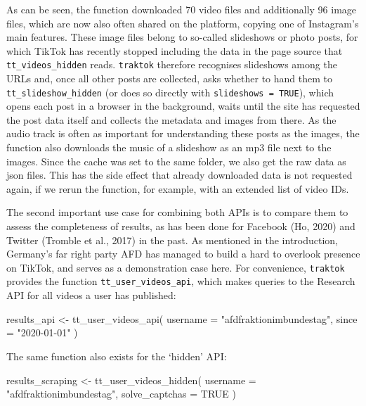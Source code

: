 \documentclass[
  nobib]{ccr}
\newenvironment{Shaded}{\begin{snugshade}}{\end{snugshade}}
\newcommand{\AttributeTok}[1]{\textcolor[rgb]{0.40,0.45,0.13}{#1}}
\newcommand{\ConstantTok}[1]{\textcolor[rgb]{0.56,0.35,0.01}{#1}}
\newcommand{\FunctionTok}[1]{\textcolor[rgb]{0.28,0.35,0.67}{#1}}
\newcommand{\NormalTok}[1]{\textcolor[rgb]{0.00,0.23,0.31}{#1}}
\newcommand{\OtherTok}[1]{\textcolor[rgb]{0.00,0.23,0.31}{#1}}
\newcommand{\StringTok}[1]{\textcolor[rgb]{0.13,0.47,0.30}{#1}}
\begin{document}
As can be seen, the function downloaded 70 video files and additionally
96 image files, which are now also often shared on the platform, copying
one of Instagram's main features. These image files belong to so-called
slideshows or photo posts, for which TikTok has recently stopped
including the data in the page source that \texttt{tt\_videos\_hidden}
reads. \texttt{traktok} therefore recognises slideshows among the URLs
and, once all other posts are collected, asks whether to hand them to
\texttt{tt\_slideshow\_hidden} (or does so directly with
\texttt{slideshows\ =\ TRUE}), which opens each post in a browser in the
background, waits until the site has requested the post data itself and
collects the metadata and images from there. As the audio track is often
as important for understanding these posts as the images, the function
also downloads the music of a slideshow as an mp3 file next to the
images. Since the cache was set to the same folder, we also get the raw
data as json files. This has the side effect that already downloaded
data is not requested again, if we rerun the function, for example, with
an extended list of video IDs.

The second important use case for combining both APIs is to compare them
to assess the completeness of results, as has been done for Facebook
(Ho, 2020) and Twitter (Tromble et al., 2017) in the past. As mentioned
in the introduction, Germany's far right party AFD has managed to build
a hard to overlook presence on TikTok, and serves as a demonstration
case here. For convenience, \texttt{traktok} provides the function
\texttt{tt\_user\_videos\_api}, which makes queries to the Research API
for all videos a user has published:

\begin{Shaded}
\begin{Highlighting}[]
\NormalTok{results\_api }\OtherTok{\textless{}{-}} \FunctionTok{tt\_user\_videos\_api}\NormalTok{(}
  \AttributeTok{username =} \StringTok{"afdfraktionimbundestag"}\NormalTok{,}
  \AttributeTok{since =} \StringTok{"2020{-}01{-}01"}
\NormalTok{)}
\end{Highlighting}
\end{Shaded}

The same function also exists for the `hidden' API:

\begin{Shaded}
\begin{Highlighting}[]
\NormalTok{results\_scraping }\OtherTok{\textless{}{-}} \FunctionTok{tt\_user\_videos\_hidden}\NormalTok{(}
  \AttributeTok{username =} \StringTok{"afdfraktionimbundestag"}\NormalTok{,}
  \AttributeTok{solve\_captchas =} \ConstantTok{TRUE}
\NormalTok{)}
\end{Highlighting}
\end{Shaded}
\end{document}
